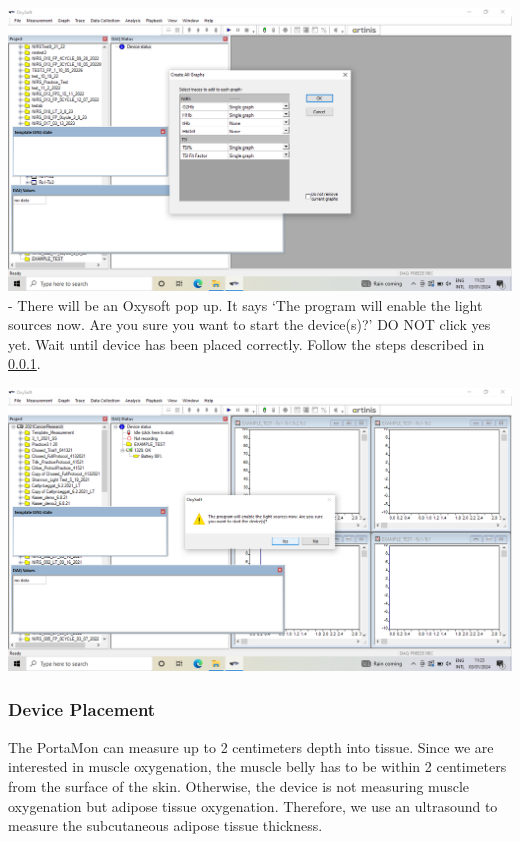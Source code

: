 \documentclass[
]{book}
\begin{document}
\includegraphics[width=1\linewidth]{images/startnewmeasurement/16_create_all_graphs_popup}
- There will be an Oxysoft pop up. It says `The program will enable the light sources now. Are you sure you want to start the device(s)?' DO NOT click yes yet. Wait until device has been placed correctly. Follow the steps described in \ref{Appendix-Instruments-PortaMon-Usage-Placement}.

\includegraphics[width=1\linewidth]{images/startnewmeasurement/17_enable_light_sources_popup}

\hypertarget{Appendix-Instruments-PortaMon-Usage-Placement}{%
\subsubsection{Device Placement}\label{Appendix-Instruments-PortaMon-Usage-Placement}}

The PortaMon can measure up to 2 centimeters depth into tissue. Since we are interested in muscle oxygenation, the muscle belly has to be within 2 centimeters from the surface of the skin. Otherwise, the device is not measuring muscle oxygenation but adipose tissue oxygenation. Therefore, we use an ultrasound to measure the subcutaneous adipose tissue thickness.
\end{document}
